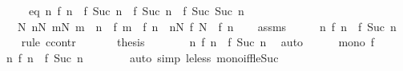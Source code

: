 \begin{isabellebody}
\ \ \ \ \ eq{\isacharcolon}{\kern0pt}\ {\isachardoublequoteopen}{\isasymforall}n{\isachardot}{\kern0pt}\ f\ n\ {\isacharequal}{\kern0pt}\ f\ {\isacharparenleft}{\kern0pt}Suc\ n{\isacharparenright}{\kern0pt}\ {\isasymlongrightarrow}\ f\ {\isacharparenleft}{\kern0pt}Suc\ n{\isacharparenright}{\kern0pt}\ {\isacharequal}{\kern0pt}\ f\ {\isacharparenleft}{\kern0pt}Suc\ {\isacharparenleft}{\kern0pt}Suc\ n{\isacharparenright}{\kern0pt}{\isacharparenright}{\kern0pt}{\isachardoublequoteclose}\isanewline
\ \ \ {\isachardoublequoteopen}{\isasymexists}N{\isachardot}{\kern0pt}\ {\isacharparenleft}{\kern0pt}{\isasymforall}n{\isasymle}N{\isachardot}{\kern0pt}\ {\isasymforall}m{\isasymle}N{\isachardot}{\kern0pt}\ m\ {\isacharless}{\kern0pt}\ n\ {\isasymlongrightarrow}\ f\ m\ {\isacharless}{\kern0pt}\ f\ n{\isacharparenright}{\kern0pt}\ {\isasymand}\ {\isacharparenleft}{\kern0pt}{\isasymforall}n{\isasymge}N{\isachardot}{\kern0pt}\ f\ N\ {\isacharequal}{\kern0pt}\ f\ n{\isacharparenright}{\kern0pt}{\isachardoublequoteclose}\isanewline
%
\isadelimproof
\ \ %
\endisadelimproof
%
\isatagproof
{}\isamarkupfalse%
\ assms\isanewline
{}\isamarkupfalse%
\ {\isacharminus}{\kern0pt}\isanewline
\ \ \isamarkupfalse%
\ {\isachardoublequoteopen}{\isasymexists}n{\isachardot}{\kern0pt}\ f\ n\ {\isacharequal}{\kern0pt}\ f\ {\isacharparenleft}{\kern0pt}Suc\ n{\isacharparenright}{\kern0pt}{\isachardoublequoteclose}\isanewline
\ \ \isamarkupfalse%
\ {\isacharparenleft}{\kern0pt}rule\ ccontr{\isacharparenright}{\kern0pt}\isanewline
\ \ \ \ \isamarkupfalse%
\ {\isachardoublequoteopen}{\isasymnot}\ {\isacharquery}{\kern0pt}thesis{\isachardoublequoteclose}\isanewline
\ \ \ \ \isamarkupfalse%
\ \isamarkupfalse%
\ {\isachardoublequoteopen}{\isasymAnd}n{\isachardot}{\kern0pt}\ f\ n\ {\isasymnoteq}\ f\ {\isacharparenleft}{\kern0pt}Suc\ n{\isacharparenright}{\kern0pt}{\isachardoublequoteclose}\ \isamarkupfalse%
\ auto\isanewline
\ \ \ \ \isamarkupfalse%
\ {\isacartoucheopen}mono\ f{\isacartoucheclose}\ \isamarkupfalse%
\ {\isachardoublequoteopen}{\isasymAnd}n{\isachardot}{\kern0pt}\ f\ n\ {\isacharless}{\kern0pt}\ f\ {\isacharparenleft}{\kern0pt}Suc\ n{\isacharparenright}{\kern0pt}{\isachardoublequoteclose}\isanewline
\ \ \ \ \ \ \isamarkupfalse%
\ {\isacharparenleft}{\kern0pt}auto\ simp{\isacharcolon}{\kern0pt}\ le{\isacharunderscore}{\kern0pt}less\ mono{\isacharunderscore}{\kern0pt}iff{\isacharunderscore}{\kern0pt}le{\isacharunderscore}{\kern0pt}Suc{\isacharparenright}{\kern0pt}\isanewline

\end{isabellebody}
